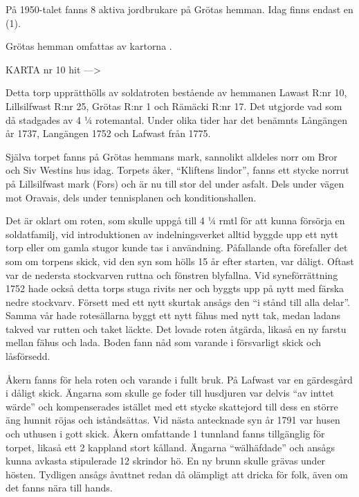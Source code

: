 På 1950-talet fanns 8 aktiva jordbrukare på Grötas hemman. Idag finns endast en (1).

Grötas hemman omfattas av kartorna .

KARTA nr 10 hit --->



Detta torp upprätthölls av soldatroten bestående av hemmanen Lawast R:nr 10, Lillsilfwast R:nr 25, Grötas R:nr 1 och Rämäcki R:nr 17. Det utgjorde vad som då stadgades av 4 ¼ rotemantal. Under olika tider har det benämnts Långängen år 1737, Langängen 1752 och Lafwast från 1775.

Själva torpet fanns på Grötas hemmans mark, sannolikt alldeles norr om Bror och Siv Westins hus idag. Torpets åker, ``Kliftens lindor'', fanns ett stycke norrut på Lillsilfwast mark (Fors) och är nu till stor del under asfalt. Dels under vägen mot Oravais, dels under tennisplanen och konditionshallen.

Det är oklart om roten, som skulle uppgå till 4 ¼ rmtl för att kunna försörja en soldatfamilj, vid introduktionen av  indelningsverket alltid byggde upp ett nytt torp eller om gamla stugor kunde tas i användning. Påfallande ofta förefaller det som om torpens skick, vid den syn som hölls 15 år efter starten, var dåligt. Oftast var de nedersta stockvarven ruttna och fönstren blyfallna. Vid syneförrättning 1752 hade också detta torps stuga rivits ner och byggts upp på nytt med färska nedre stockvarv. Försett med ett nytt skurtak ansågs den ``i stånd till alla delar''. Samma vår hade rotesällarna byggt ett nytt fähus med nytt tak, medan ladans takved var rutten och taket läckte. Det lovade roten åtgärda, likaså en ny farstu mellan fähus och lada. Boden fann nåd som varande i försvarligt skick och låsförsedd.

Åkern fanns för hela roten och varande i fullt bruk. På Lafwast var en gärdesgård i dåligt skick. Ängarna som skulle ge foder till husdjuren var delvis ``av inttet wärde'' och kompenserades istället med ett stycke skattejord till dess en större äng hunnit röjas och iståndsättas. Vid nästa antecknade syn år 1791 var husen och uthusen i gott skick. Åkern omfattande 1 tunnland fanns tillgänglig för torpet, likaså ett 2 kappland stort kålland. Ängarna ``wälhäfdade'' och ansågs kunna avkasta stipulerade 12 skrindor hö. En ny brunn skulle grävas under hösten. Tydligen ansågs åvattnet redan då olämpligt att dricka för folk, även om det fanns nära till hands.

